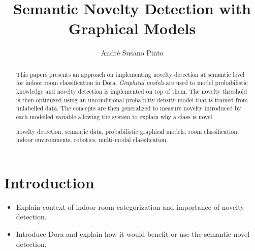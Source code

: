 \documentclass[runningheads,a4paper]{llncs}
\newcommand{\keywords}[1]{\par\addvspace\baselineskip
\noindent\keywordname\enspace\ignorespaces#1}
\begin{document}
\mainmatter  %

\title{Semantic Novelty Detection with Graphical Models}


%
%
\author{André Susano Pinto}
%


\maketitle


\begin{abstract}
This papers presents an approach on implementing novelty detection at semantic level
for indoor room classification in Dora. \emph{Graphical models} are used to model
probabilistic knowledge and novelty detection is implemented on top of them.
The novelty threshold is then optimized using an unconditional probability density
model that is trained from unlabelled data.
The concepts are then generalized to measure novelty introduced by each modelled
variable allowing the system to explain why a class is novel.


\keywords{novelty detection, semantic data, probabilistic graphical models,
room classification, indoor environments, robotics, multi-modal classification.}
\end{abstract}


\section{Introduction}
\begin{itemize}
\item Explain context of indoor room categorization and importance of novelty detection.
\item Introduce Dora and explain how it would benefit or use the semantic novel detection.
\end{itemize}
\end{document}
